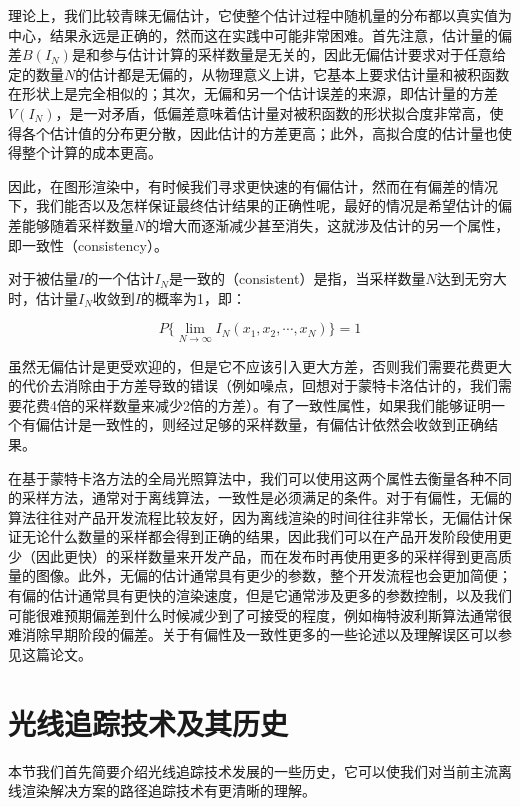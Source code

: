 理论上，我们比较青睐无偏估计，它使整个估计过程中随机量的分布都以真实值为中心，结果永远是正确的，然而这在实践中可能非常困难。首先注意，估计量的偏差$B(I_N)$是和参与估计计算的采样数量是无关的，因此无偏估计要求对于任意给定的数量$N$的估计都是无偏的，从物理意义上讲，它基本上要求估计量和被积函数在形状上是完全相似的；其次，无偏和另一个估计误差的来源，即估计量的方差$V(I_N)$，是一对矛盾，低偏差意味着估计量对被积函数的形状拟合度非常高，使得各个估计值的分布更分散，因此估计的方差更高；此外，高拟合度的估计量也使得整个计算的成本更高。

因此，在图形渲染中，有时候我们寻求更快速的有偏估计，然而在有偏差的情况下，我们能否以及怎样保证最终估计结果的正确性呢，最好的情况是希望估计的偏差能够随着采样数量$N$的增大而逐渐减少甚至消失，这就涉及估计的另一个属性，即一致性（consistency）。

对于被估量$I$的一个估计$I_N$是一致的（consistent）是指，当采样数量$N$达到无穷大时，估计量$I_N$收敛到$I$的概率为1，即：

\begin{equation}
	P\{\lim_{N\to \infty}I_N(x_1,x_2,\cdots,x_N)\}=1
\end{equation}

虽然无偏估计是更受欢迎的，但是它不应该引入更大方差，否则我们需要花费更大的代价去消除由于方差导致的错误（例如噪点，回想对于蒙特卡洛估计的，我们需要花费4倍的采样数量来减少2倍的方差）。有了一致性属性，如果我们能够证明一个有偏估计是一致性的，则经过足够的采样数量，有偏估计依然会收敛到正确结果。

在基于蒙特卡洛方法的全局光照算法中，我们可以使用这两个属性去衡量各种不同的采样方法，通常对于离线算法，一致性是必须满足的条件。对于有偏性，无偏的算法往往对产品开发流程比较友好，因为离线渲染的时间往往非常长，无偏估计保证无论什么数量的采样都会得到正确的结果，因此我们可以在产品开发阶段使用更少（因此更快）的采样数量来开发产品，而在发布时再使用更多的采样得到更高质量的图像。此外，无偏的估计通常具有更少的参数，整个开发流程也会更加简便；有偏的估计通常具有更快的渲染速度，但是它通常涉及更多的参数控制，以及我们可能很难预期偏差到什么时候减少到了可接受的程度，例如梅特波利斯算法通常很难消除早期阶段的偏差。关于有偏性及一致性更多的一些论述以及理解误区可以参见\cite{a:FiveCommonMisconceptionsaboutBiasinLightTransportSimulation}这篇论文。



 

\section{光线追踪技术及其历史}\label{sec:pt-history}
本节我们首先简要介绍光线追踪技术发展的一些历史，它可以使我们对当前主流离线渲染解决方案的路径追踪技术有更清晰的理解。

